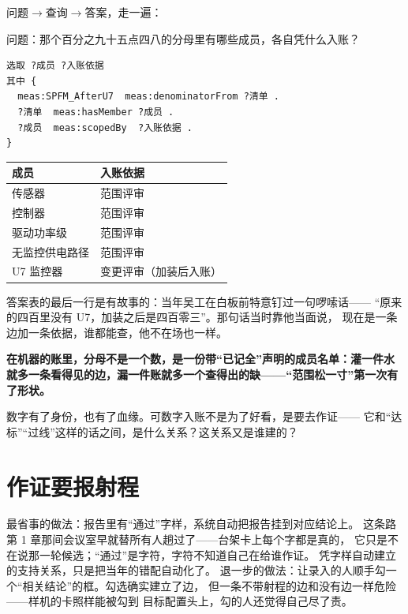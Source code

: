 问题\(\rightarrow\)查询\(\rightarrow\)答案，走一遍：

问题：那个百分之九十五点四八的分母里有哪些成员，各自凭什么入账？

\nopagebreak[4]
\begin{codebox}
\begin{Verbatim}[fontsize=\small,breaklines=true,breakanywhere=true,breaksymbolleft={},breaksymbolright={}]
选取 ?成员 ?入账依据
其中 {
  meas:SPFM_AfterU7  meas:denominatorFrom ?清单 .
  ?清单  meas:hasMember ?成员 .
  ?成员  meas:scopedBy  ?入账依据 .
}
\end{Verbatim}
\end{codebox}

\begin{center}
\begingroup\small
\setlength{\tabcolsep}{4pt}
\begin{tabularx}{\linewidth}{@{}XX@{}}
\toprule
成员 & 入账依据 \\
\midrule
传感器 & 范围评审 \\
控制器 & 范围评审 \\
驱动功率级 & 范围评审 \\
无监控供电路径 & 范围评审 \\
U7 监控器 & 变更评审（加装后入账） \\
\bottomrule
\end{tabularx}
\endgroup
\end{center}

答案表的最后一行是有故事的：当年吴工在白板前特意钉过一句啰嗦话——
“原来的四百里没有 U7，加装之后是四百零三”。那句话当时靠他当面说，
现在是一条边加一条依据，谁都能查，他不在场也一样。

\textbf{在机器的账里，分母不是一个数，是一份带“已记全”声明的成员名单：灌一件水就多一条看得见的边，漏一件账就多一个查得出的缺——“范围松一寸”第一次有了形状。}

数字有了身份，也有了血缘。可数字入账不是为了好看，是要去作证——
它和“达标”“过线”这样的话之间，是什么关系？这关系又是谁建的？

\section{作证要报射程}

最省事的做法：报告里有“通过”字样，系统自动把报告挂到对应结论上。
这条路第 1 章那间会议室早就替所有人趟过了——台架卡上每个字都是真的，
它只是不在说那一轮候选；“通过”是字符，字符不知道自己在给谁作证。
凭字样自动建立的支持关系，只是把当年的错配自动化了。
退一步的做法：让录入的人顺手勾一个“相关结论”的框。勾选确实建立了边，
但一条不带射程的边和没有边一样危险——样机的卡照样能被勾到
目标配置头上，勾的人还觉得自己尽了责。

